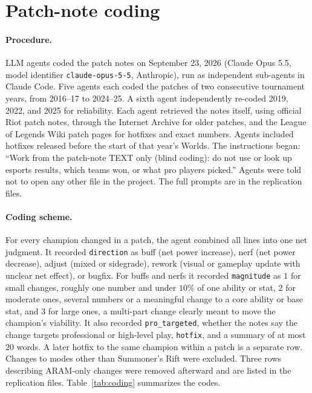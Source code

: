 \documentclass[11pt]{article}
\begin{document}
\section{Patch-note coding}
\label{app:coding}
\paragraph{Procedure.} LLM agents coded the patch notes on September 23, 2026 (Claude Opus 5.5, model identifier \texttt{claude-opus-5-5}, Anthropic), run as independent sub-agents in Claude Code. Five agents each coded the patches of two consecutive tournament years, from 2016--17 to 2024--25. A sixth agent independently re-coded 2019, 2022, and 2025 for reliability. Each agent retrieved the notes itself, using official Riot patch notes, through the Internet Archive for older patches, and the League of Legends Wiki patch pages for hotfixes and exact numbers. Agents included hotfixes released before the start of that year's Worlds. The instructions began: ``Work from the patch-note TEXT only (blind coding): do not use or look up esports results, which teams won, or what pro players picked.'' Agents were told not to open any other file in the project. The full prompts are in the replication files.

\paragraph{Coding scheme.} For every champion changed in a patch, the agent combined all lines into one net judgment. It recorded \texttt{direction} as buff (net power increase), nerf (net power decrease), adjust (mixed or sidegrade), rework (visual or gameplay update with unclear net effect), or bugfix. For buffs and nerfs it recorded \texttt{magnitude} as $1$ for small changes, roughly one number and under $10\%$ of one ability or stat, $2$ for moderate ones, several numbers or a meaningful change to a core ability or base stat, and $3$ for large ones, a multi-part change clearly meant to move the champion's viability. It also recorded \texttt{pro\_targeted}, whether the notes say the change targets professional or high-level play, \texttt{hotfix}, and a summary of at most $20$ words. A later hotfix to the same champion within a patch is a separate row. Changes to modes other than Summoner's Rift were excluded. Three rows describing ARAM-only changes were removed afterward and are listed in the replication files. Table~\ref{tab:coding} summarizes the codes.
\end{document}
